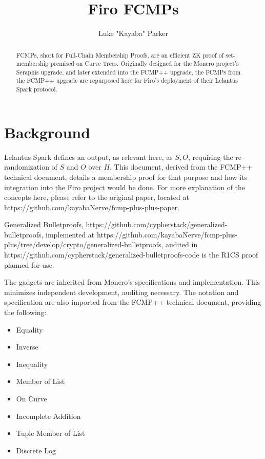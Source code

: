 \documentclass[]{article}
\title{Firo FCMPs}
\author{Luke "Kayaba" Parker}
\begin{document}
\maketitle

\begin{abstract}
	
	FCMPs, short for Full-Chain Membership Proofs, are an efficient ZK proof of set-membership premised on Curve Trees. Originally designed for the Monero project's Seraphis upgrade, and later extended into the FCMP++ upgrade, the FCMPs from the FCMP++ upgrade are repurposed here for Firo's deployment of their Lelantus Spark protocol.

\end{abstract}

\section{Background}

\newcommand{\hashtopoint}{\mathsf{HashToPoint}}

Lelantus Spark defines an output, as relevant here, as $S, O$, requiring the re-randomization of $S$ and $O$ over $H$. This document, derived from the FCMP++ technical document, details a membership proof for that purpose and how its integration into the Firo project would be done. For more explanation of the concepts here, please refer to the original paper, located at https://github.com/kayabaNerve/fcmp-plus-plus-paper.

Generalized Bulletproofs, https://github.com/cypherstack/generalized-bulletproofs, implemented at https://github.com/kayabaNerve/fcmp-plus-plus/tree/develop/crypto/generalized-bulletproofs, audited in https://github.com/cypherstack/generalized-bulletproofs-code is the R1CS proof planned for use.

The gadgets are inherited from Monero's specifications and implementation. This minimizes independent development, auditing necessary. The notation and specification are also imported from the FCMP++ technical document, providing the following:

\begin{itemize}
\item Equality
\item Inverse
\item Inequality
\item Member of List
\item On Curve
\item Incomplete Addition
\item Tuple Member of List
\item Discrete Log
\end{itemize}
\end{document}
